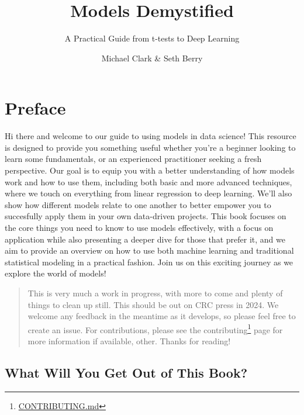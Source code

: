 \documentclass[
  letterpaper,
]{krantz}
\title{Models Demystified}
\subtitle{A Practical Guide from t-tests to Deep Learning}
\author{Michael Clark \& Seth Berry}
\date{}
\renewcommand*\contentsname{Table of contents}
\newcommand\contentsname{Table of contents}
\DeclareRobustCommand{\href}[2]{#2\footnote{\url{#1}}}
\begin{document}
\maketitle


\renewcommand*\contentsname{Contents}
{
\setcounter{tocdepth}{2}
\tableofcontents
}

\chapter*{Preface}\label{sec-preface}


Hi there and welcome to our guide to using models in data science! This
resource is designed to provide you something useful whether you're a
beginner looking to learn some fundamentals, or an experienced
practitioner seeking a fresh perspective. Our goal is to equip you with
a better understanding of how models work and how to use them, including
both basic and more advanced techniques, where we touch on everything
from linear regression to deep learning. We'll also show how different
models relate to one another to better empower you to succesfully apply
them in your own data-driven projects. This book focuses on the core
things you need to know to use models effectively, with a focus on
application while also presenting a deeper dive for those that prefer
it, and we aim to provide an overview on how to use both machine
learning and traditional statistical modeling in a practical fashion.
Join us on this exciting journey as we explore the world of models!

\begin{quote}
This is very much a work in progress, with more to come and plenty of
things to clean up still. This should be out on CRC press in 2024. We
welcome any feedback in the meantime as it develops, so please feel free
to create an issue. For contributions, please see the
\href{CONTRIBUTING.md}{contributing} page for more information if
available, other. Thanks for reading!
\end{quote}

\section*{What Will You Get Out of This
Book?}\label{what-will-you-get-out-of-this-book}
\end{document}
